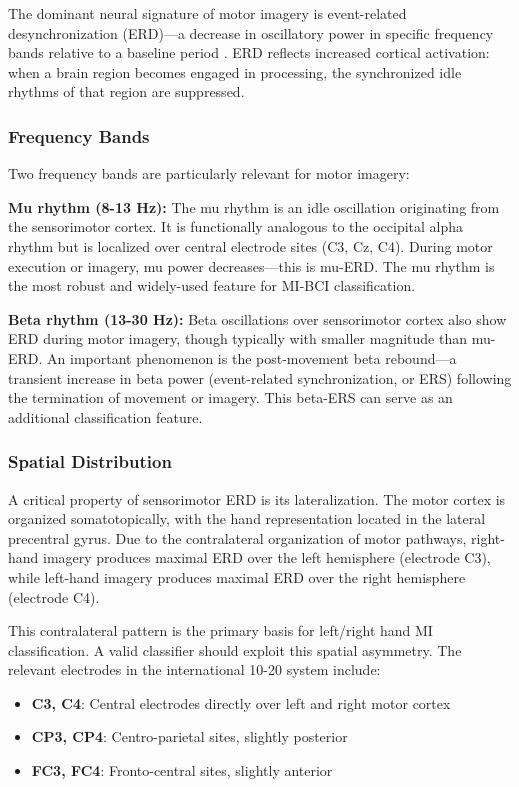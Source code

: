 The dominant neural signature of motor imagery is event-related desynchronization (ERD)—a decrease in oscillatory power in specific frequency bands relative to a baseline period \cite{pfurtscheller1999erds}. ERD reflects increased cortical activation: when a brain region becomes engaged in processing, the synchronized idle rhythms of that region are suppressed.

\subsubsection{Frequency Bands}

Two frequency bands are particularly relevant for motor imagery:

\textbf{Mu rhythm (8-13 Hz):} The mu rhythm is an idle oscillation originating from the sensorimotor cortex. It is functionally analogous to the occipital alpha rhythm but is localized over central electrode sites (C3, Cz, C4). During motor execution or imagery, mu power decreases—this is mu-ERD. The mu rhythm is the most robust and widely-used feature for MI-BCI classification.

\textbf{Beta rhythm (13-30 Hz):} Beta oscillations over sensorimotor cortex also show ERD during motor imagery, though typically with smaller magnitude than mu-ERD. An important phenomenon is the post-movement beta rebound—a transient increase in beta power (event-related synchronization, or ERS) following the termination of movement or imagery. This beta-ERS can serve as an additional classification feature.

\subsubsection{Spatial Distribution}

A critical property of sensorimotor ERD is its lateralization. The motor cortex is organized somatotopically, with the hand representation located in the lateral precentral gyrus. Due to the contralateral organization of motor pathways, right-hand imagery produces maximal ERD over the left hemisphere (electrode C3), while left-hand imagery produces maximal ERD over the right hemisphere (electrode C4).

This contralateral pattern is the primary basis for left/right hand MI classification. A valid classifier should exploit this spatial asymmetry. The relevant electrodes in the international 10-20 system include:

\begin{itemize}
    \item \textbf{C3, C4}: Central electrodes directly over left and right motor cortex
    \item \textbf{CP3, CP4}: Centro-parietal sites, slightly posterior
    \item \textbf{FC3, FC4}: Fronto-central sites, slightly anterior
\end{itemize}

